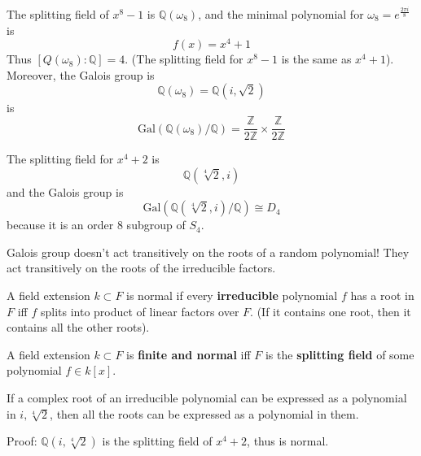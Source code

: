 \documentclass[openany]{book}
\newcommand{\Z}{\mathbb{Z}}
\newcommand{\Q}{\mathbb{Q}}
\newcommand{\gal}{\text{Gal}}
\newcommand{\om}{\omega}
\begin{document}
\begin{example}
    The splitting field of $x^8-1$ is $\Q(\om_8)$, and the minimal polynomial for $\om_8=e^\frac{2\pi i}{8}$ is 
    \begin{equation*}
        f(x)=x^4+1
    \end{equation*}
    Thus $[Q(\om_8):\Q]=4$. (The splitting field for $x^8-1$ is the same as $x^4+1$). Moreover, the Galois group is 
    \begin{equation*}
        \Q(\om_8)=\Q(i,\sqrt{2})
    \end{equation*}
    is 
    \begin{equation*}
        \gal(\Q(\om_8)/\Q)=\frac{\Z}{2\Z}\times\frac{\Z}{2\Z}
    \end{equation*}
\end{example}

\begin{example}
    The splitting field for $x^4+2$ is 
    \begin{equation*}
        \Q(\sqrt[4]{2},i)
    \end{equation*}
    and the Galois group is 
    \begin{equation*}
        \gal(\Q(\sqrt[4]{2},i)/\Q)\cong D_4
    \end{equation*}
    because it is an order $8$ subgroup of $S_4$.
\end{example}

\begin{warn}
    Galois group doesn't act transitively on the roots of a random polynomial! They act transitively on the roots of the irreducible factors.
\end{warn}

\begin{defn}[normal]
    A field extension $k\subset F$ is normal if every \textbf{irreducible} polynomial $f$ has a root in $F$ iff $f$ splits into product of linear factors over $F$. (If it contains one root, then it contains all the other roots).
\end{defn}


\begin{prop}
    A field extension $k\subset F$ is \textbf{finite and normal} iff $F$ is the \textbf{splitting field} of some polynomial $f\in k[x]$.
\end{prop}

\begin{example}
    If a complex root of an irreducible polynomial can be expressed as a polynomial in $i, \sqrt[4]{2}$, then all the roots can be expressed as a polynomial in them. 

    Proof: $\Q(i, \sqrt[4]{2})$ is the splitting field of $x^4+2$, thus is normal.
\end{example}
\end{document}
